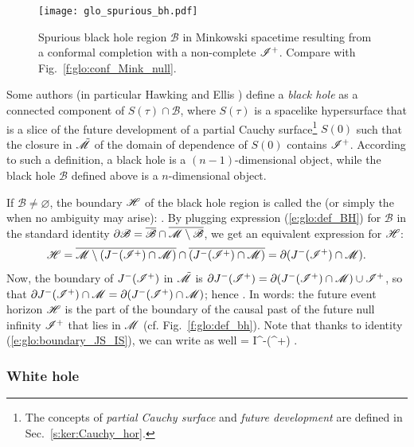 \begin{figure}
\centerline{\texttt{[image: glo\_spurious\_bh.pdf]}}
\caption[]{\label{f:glo:spurious_bh} \footnotesize
Spurious black hole region $\mathscr{B}$ in Minkowski spacetime resulting
from a conformal completion with a non-complete $\mathscr{I}^+$.
Compare with Fig.~\ref{f:glo:conf_Mink_null}.}
\end{figure}



\begin{remark}
Some authors (in particular Hawking and Ellis \cite{HawkiE73}) define a
\emph{black hole} as a connected component of
$S(\tau) \cap \mathscr{B}$, where $S(\tau)$ is a spacelike
hypersurface that is a slice of the future development of a partial
Cauchy surface\footnote{The concepts of \emph{partial Cauchy surface}
and \emph{future development} are defined in Sec.~\ref{s:ker:Cauchy_hor}.} $S(0)$ such that the
closure in $\tilde{\mathscr{M}}$ of the domain of dependence of $S(0)$ contains $\mathscr{I}^+$.
According to such a definition, a black hole is a $(n-1)$-dimensional object,
while the black hole $\mathscr{B}$ defined above is a $n$-dimensional object.
\end{remark}

If $\mathscr{B}\not=\varnothing$, the boundary $\mathscr{H}$ of the black hole region
is called the 
(or simply the 
when no ambiguity may arise):
\be
    .
\ee
By plugging expression (\ref{e:glo:def_BH}) for $\mathscr{B}$ in the standard
identity $\partial \mathscr{B} =
\overline{\mathscr{B}} \cap \overline{\mathscr{M}\setminus \mathscr{B}}$, we get
an equivalent expression for $\mathscr{H}$:
\[
    \mathscr{H} = \overline{\mathscr{M} \setminus (J^-(\mathscr{I}^+)\cap\mathscr{M})} \cap
        \overline{(J^-(\mathscr{I}^+)\cap\mathscr{M})}
        = \partial(J^-(\mathscr{I}^+)\cap\mathscr{M}) .
\]
Now, the boundary of $J^-(\mathscr{I}^+)$ in $\tilde{\mathscr{M}}$ is
$\partial J^-(\mathscr{I}^+) = \partial (J^-(\mathscr{I}^+)\cap\mathscr{M}) \cup \mathscr{I}^+$, so that
$\partial J^-(\mathscr{I}^+) \cap \mathscr{M} =  \partial(J^-(\mathscr{I}^+)\cap\mathscr{M})$; hence
\be
    .
\ee
In words: the future event horizon $\mathscr{H}$ is the part of the boundary of the causal past
of the future null infinity $\mathscr{I}^+$ that lies in $\mathscr{M}$ (cf. Fig.~\ref{f:glo:def_bh}).
Note that thanks to identity (\ref{e:glo:boundary_JS_IS}), we can write as
well
\be
    \Hor = \partial I^-(\scri^+) \cap \M .
\ee

\subsubsection{White hole}

